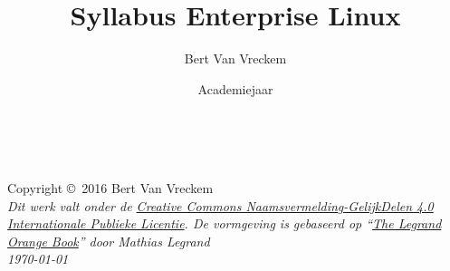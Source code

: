 \documentclass[11pt,fleqn,a4paper]{book}
\author{Bert Van Vreckem}
\title{Syllabus Enterprise Linux}
\date{Academiejaar \acadj}
\begin{document}
\thetitlepage


\newpage
~\vfill
\thispagestyle{empty}

\noindent Copyright \copyright\ 2016 Bert Van Vreckem\\ %

\noindent \textit{Dit werk valt onder de \href{http://creativecommons.org/licenses/by-sa/4.0/}{Creative Commons Naamsvermelding-GelijkDelen 4.0 Internationale Publieke Licentie}. De vormgeving is gebaseerd op ``\href{http://www.latextemplates.com/template/the-legrand-orange-book}{The Legrand Orange Book}'' door Mathias Legrand}\\

\noindent \textit{\today} %

\usechapterimagefalse

\tableofcontents %

\cleardoublepage %





\printbibliography[notkeyword=voorbeeld]
\end{document}
